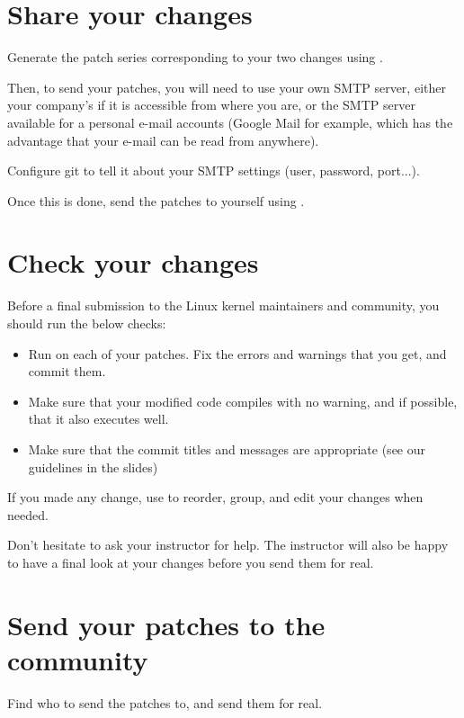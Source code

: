 \section{Share your changes}

Generate the patch series corresponding to your two changes using
.

Then, to send your patches, you will need to use your own SMTP server, either your company's
if it is accessible from where you are, or the SMTP server available for a personal e-mail 
accounts (Google Mail for example, which has the advantage that your e-mail can be read
from anywhere). 

Configure git to tell it about your SMTP settings (user, password, port...).

Once this is done, send the patches to yourself using .

\section{Check your changes}

Before a final submission to the Linux kernel maintainers and community, you 
should run the below checks:

\begin{itemize}
\item Run  on each of your patches.
      Fix the errors and warnings that you get, and commit them.
\item Make sure that your modified code compiles with no warning,
      and if possible, that it also executes well.
\item Make sure that the commit titles and messages are appropriate
      (see our guidelines in the slides)
\end{itemize}

If you made any change, use  to
reorder, group, and edit your changes when needed. 

Don't hesitate to ask your instructor for help. The instructor will also 
be happy to have a final look at your changes before you send them for real.

\section{Send your patches to the community}

Find who to send the patches to, and send them for real.

